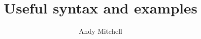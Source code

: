 \documentclass[a4paper,10pt]{article}
\author{Andy Mitchell}
\title{Useful syntax and examples}
\begin{document}
 
\maketitle 
\begin{flushleft}
\tableofcontents


\end{flushleft}
\end{document}
